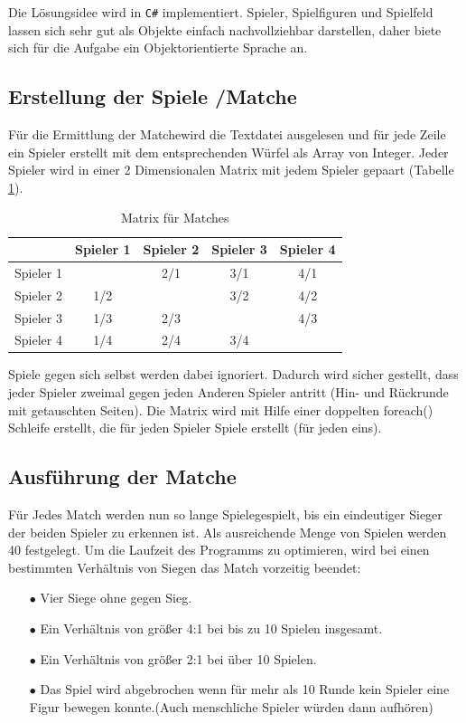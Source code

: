 \documentclass[a4paper,11pt,ngerman]{scrartcl}
\begin{document}
Die Lösungsidee wird in \texttt{C\#} implementiert. Spieler, Spielfiguren und Spielfeld lassen sich sehr gut als Objekte einfach nachvollziehbar darstellen, daher biete sich für die Aufgabe ein Objektorientierte Sprache an.
\subsection{Erstellung der Spiele /\glqq Matche\grqq} 
Für die Ermittlung der \glqq Matche\grqq\space wird die Textdatei ausgelesen und für jede Zeile ein Spieler erstellt mit dem entsprechenden Würfel als Array von Integer. Jeder Spieler wird in einer 2 Dimensionalen Matrix mit jedem Spieler gepaart (Tabelle \ref{table:Matrix}).
\begin{table}	
	\centering
	\begin{tabular}{|c|c|c|c|c|}	
		\hline
		& Spieler 1 & Spieler 2 & Spieler 3 & Spieler 4\\
		\hline
		Spieler 1 &\cellcolor{mygray}& 2/1 & 3/1 & 4/1 \\	
		\hline
		Spieler 2 & 1/2 & \cellcolor{mygray} & 3/2 & 4/2 \\
		\hline
		Spieler 3 & 1/3 & 2/3 &\cellcolor{mygray}& 4/3 \\
		\hline
		Spieler 4 & 1/4 & 2/4 & 3/4 & \cellcolor{mygray} \\
		\hline
	\end{tabular}
	\caption{Matrix für Matches}
	\label{table:Matrix}
\end{table}
Spiele gegen sich selbst werden dabei ignoriert. Dadurch wird sicher gestellt, dass jeder Spieler zweimal gegen jeden Anderen Spieler antritt (Hin- und Rückrunde mit getauschten Seiten). Die Matrix wird mit Hilfe einer doppelten foreach() Schleife erstellt, die für jeden Spieler Spiele erstellt (für jeden eins).
\subsection{Ausführung der \glqq Matche\grqq}
Für Jedes Match werden nun so lange \glqq Spiele\grqq \space gespielt, bis ein eindeutiger Sieger der beiden Spieler zu erkennen ist. Als ausreichende Menge von Spielen werden 40 festgelegt. Um die Laufzeit des Programms zu optimieren, wird bei einen bestimmten Verhältnis von Siegen das Match vorzeitig beendet:
\begin{enumerate}
	\item[$\bullet$] Vier Siege ohne gegen Sieg.	
	\item[$\bullet$] Ein Verhältnis von größer 4:1 bei bis zu 10 Spielen insgesamt.
	\item[$\bullet$] Ein Verhältnis von größer 2:1 bei über 10 Spielen. 
	\item[$\bullet$] Das Spiel wird abgebrochen wenn für mehr als 10 Runde kein Spieler eine Figur bewegen konnte.(Auch menschliche Spieler würden dann aufhören)
\end{enumerate}
\end{document}
